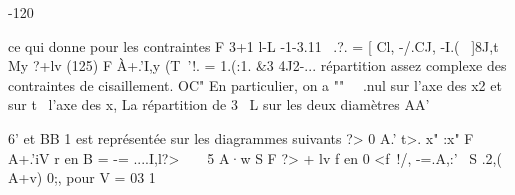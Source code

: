 -120 ­

ce qui donne pour les contraintes 
F 3+1\1 l-L -1-3.11 
~.?. = [ Cl, -/.CJ, -I.(~ ]8J,t My ?+lv
(125) 
F À+.'I,y 
(T~'!. = 1.(:1. &3 
4J2-...\+\1 
répartition assez complexe des contraintes de cisaillement. 
OC" 
En particulier, on a 
"" 
~~.nul sur l'axe des x2 et sur t 
\ 
l'axe des x, La répartition de
3 
~L sur les deux diamètres AA' 


6' 
et BB 1 est représentée sur les diagrammes suivants 
?>
0
A.' t>. x"­
:x" 
F A+.'iV r
en B = -= ....I,l?> ­
~~ 
5 A·w S F ?> + lv f
en 0 <f~!/, -=.A,:'~ S .2,( A+v) 0;, 
pour V = 03
1 


